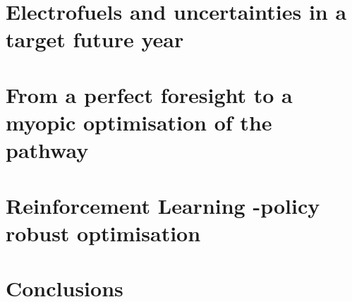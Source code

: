\documentclass[a4paper,twoside,10pt,final]{memoir} %
\begin{document}
\chapter{Electrofuels and uncertainties in a target future year}
\label{chap:chap2_electro_uq}

\clearpage

\clearemptydoublepage
\chapter{From a perfect foresight to a myopic optimisation of the pathway} 
\label{chap:chap3_myopic}

\clearpage


\clearemptydoublepage
\chapter{Reinforcement Learning -policy robust optimisation}
\label{chap:chap4_RL}

\clearpage

\clearemptydoublepage
\chapter*[Conclusions]{Conclusions} 

\clearpage









%
%


\end{document}
